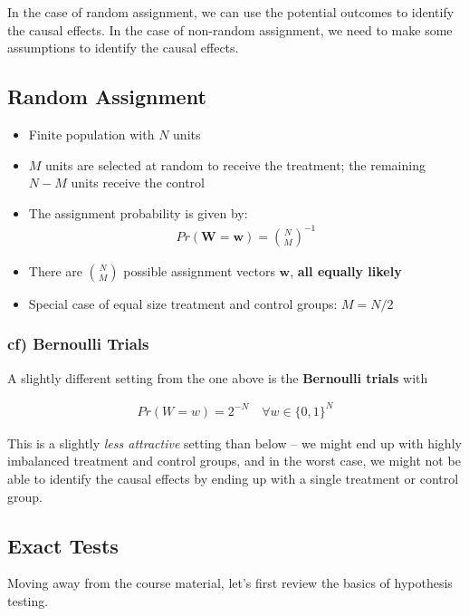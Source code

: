 In the case of random assignment, we can use the potential outcomes to identify the causal effects.
In the case of non-random assignment, we need to make some assumptions to identify the causal effects.

\clearpage

\subsection{Random Assignment}

\begin{itemize}
    \item Finite population with $N$ units
    \item $M$ units are selected at random to receive the treatment; the remaining $N-M$ units receive the control
    \item The assignment probability is given by:
    \begin{align}
        Pr(\mathbf{W} = \mathbf{w}) = \binom{N}{M}^{-1}
    \end{align}
    \item There are $\binom{N}{M}$ possible assignment vectors $\mathbf{w}$, \textbf{all equally likely}
    \item Special case of equal size treatment and control groups: $M = N/2$
\end{itemize}

\subsubsection*{cf) Bernoulli Trials}

A slightly different setting from the one above is the \textbf{Bernoulli trials} with 

\begin{align}
    Pr(W = w) = 2^{-N} \quad \forall w \in \{0, 1\}^N
\end{align}

This is a slightly \textit{less attractive} setting than below – we might end up with highly imbalanced treatment and control groups, and in the worst case, we might not be able to identify the causal effects by ending up with a single treatment or control group.


\subsection{Exact Tests}

Moving away from the course material, let's first review the basics of hypothesis testing.

